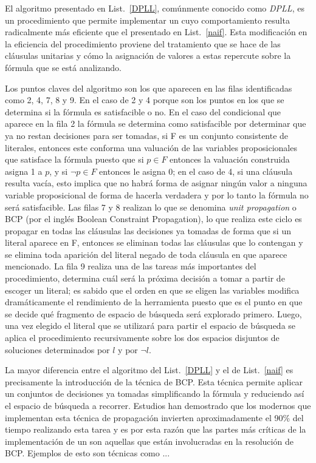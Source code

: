 El algoritmo presentado en List.~\ref{DPLL}, comúnmente conocido como \emph{DPLL}, es un procedimiento que permite implementar un \ssolver cuyo comportamiento resulta radicalmente más eficiente que el presentado en List.~\ref{naif}. Esta modificación en la eficiencia del procedimiento proviene del tratamiento que se hace de las cláusulas unitarias y cómo la asignación de valores a estas repercute sobre la fórmula que se está analizando. 

Los puntos claves del algoritmo son los que aparecen en las filas identificadas como 2, 4, 7, 8 y 9. En el caso de 2 y 4 porque son los puntos en los que se determina si la fórmula es satisfacible o no. En el caso del condicional que aparece en la fila 2 la fórmula se determina como satisfacible por determinar que ya no restan decisiones para ser tomadas, si F es un conjunto consistente de literales, entonces este conforma una valuación de las variables proposicionales que satisface la fórmula puesto que si $p \in F$ entonces la valuación construida asigna 1 a $p$, y si $\neg p \in F$ entonces le asigna 0; en el caso de 4, si una cláusula resulta vacía, esto implica que no habrá forma de asignar ningún valor a ninguna variable proposicional de forma de hacerla verdadera y por lo tanto la fórmula no será satisfacible. Las filas 7 y 8 realizan lo que se denomina \emph{unit propagation} o BCP (por el inglés Boolean Constraint Propagation), lo que realiza este ciclo es propagar en todas las cláusulas las decisiones ya tomadas de forma que si un literal aparece en F, entonces se eliminan todas las cláusulas que lo contengan y se elimina toda aparición del literal negado de toda cláusula en que aparece mencionado. La fila 9 realiza una de las tareas más importantes del procedimiento, determina cuál será la próxima decisión a tomar a partir de escoger un literal; es sabido que el orden en que se eligen las variables modifica dramáticamente el rendimiento de la herramienta puesto que es el punto en que se decide qué fragmento de espacio de búsqueda será explorado primero. Luego, una vez elegido el literal que se utilizará para partir el espacio de búsqueda se aplica el procedimiento recursivamente sobre los dos espacios disjuntos de soluciones determinados por $l$ y por $\neg l$.

La mayor diferencia entre el algoritmo del List.~\ref{DPLL} y el de List.~\ref{naif} es precisamente la introducción de la técnica de BCP. Esta técnica permite aplicar un conjuntos de decisiones ya tomadas simplificando la fórmula y reduciendo así el espacio de búsqueda a recorrer. Estudios han demostrado que los \ssolver modernos que implementan esta técnica de propagación invierten aproximadamente el 90\% del tiempo realizando esta tarea\cite{???} y es por esta razón que las partes más críticas de la implementación de un \ssolver son aquellas que están involucradas en la resolución de BCP. Ejemplos de esto son técnicas como ...


